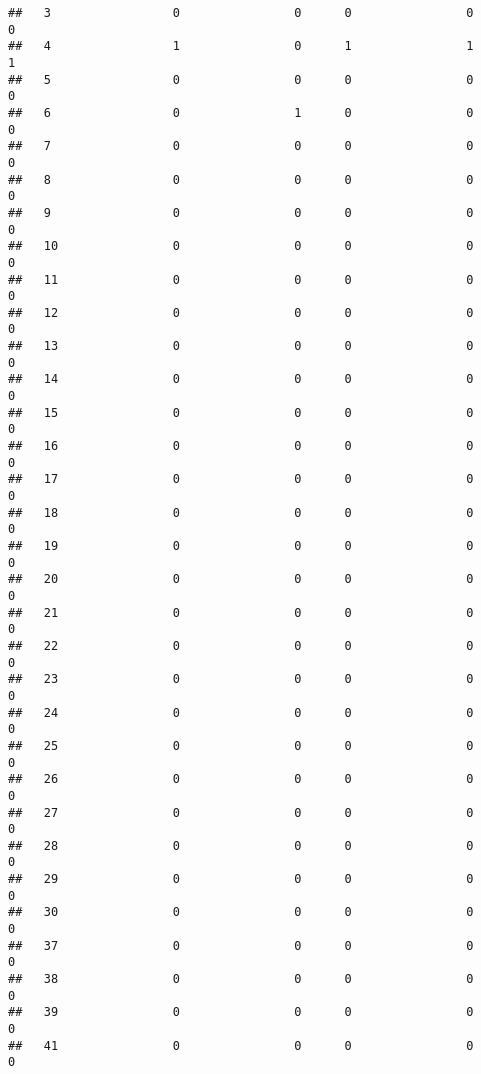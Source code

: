 \documentclass[]{article}
\begin{document}
\begin{verbatim}
##   3                 0                0      0                0                0
##   4                 1                0      1                1                1
##   5                 0                0      0                0                0
##   6                 0                1      0                0                0
##   7                 0                0      0                0                0
##   8                 0                0      0                0                0
##   9                 0                0      0                0                0
##   10                0                0      0                0                0
##   11                0                0      0                0                0
##   12                0                0      0                0                0
##   13                0                0      0                0                0
##   14                0                0      0                0                0
##   15                0                0      0                0                0
##   16                0                0      0                0                0
##   17                0                0      0                0                0
##   18                0                0      0                0                0
##   19                0                0      0                0                0
##   20                0                0      0                0                0
##   21                0                0      0                0                0
##   22                0                0      0                0                0
##   23                0                0      0                0                0
##   24                0                0      0                0                0
##   25                0                0      0                0                0
##   26                0                0      0                0                0
##   27                0                0      0                0                0
##   28                0                0      0                0                0
##   29                0                0      0                0                0
##   30                0                0      0                0                0
##   37                0                0      0                0                0
##   38                0                0      0                0                0
##   39                0                0      0                0                0
##   41                0                0      0                0                0

\end{verbatim}
\end{document}
